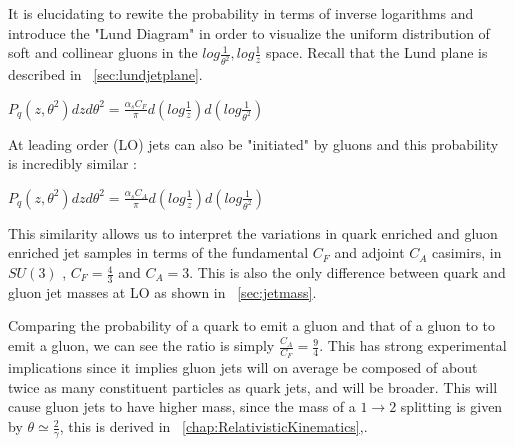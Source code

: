 It is elucidating to rewite the probability in terms of inverse logarithms and introduce the "Lund Diagram" in order to visualize the uniform distribution of soft and collinear gluons in the $log \frac{1}{ \theta^2} , log\frac{1}{z} $ space. Recall that the Lund plane is described in ~\ref{sec:lundjetplane}.




$P_q(z,\theta^2) dz d \theta^2 = \frac{\alpha_s C_F}{\pi} d( log\frac{1}{z}  ) d(log \frac{1}{ \theta^2})  $\newline

At leading order (LO) jets can also be "initiated" by gluons and this probability is incredibly similar :


$P_q(z,\theta^2) dz d \theta^2 = \frac{\alpha_s C_A}{\pi} d( log\frac{1}{z}  ) d(log \frac{1}{ \theta^2})  $\newline


This similarity allows us to interpret the variations in quark enriched and gluon enriched jet samples in terms of the fundamental $C_F$ and adjoint $C_A$ casimirs, in $SU(3)$ ,   $C_F = \frac{4}{3}$ and $C_A=3$. This is also the only difference between quark and gluon jet masses at LO as shown in ~\ref{sec:jetmass}.


Comparing the probability of a quark to emit a gluon and that of a gluon to to emit a gluon, we can see the ratio is simply $\frac{C_A}{C_F} =\frac{9}{4} $. This has strong experimental implications since it implies gluon jets will on average be composed of about twice as many constituent particles as quark jets, and will be broader. This will cause gluon jets to have higher mass, since the mass of a $1 \rightarrow 2 $ splitting is given by $\theta \simeq \frac{2}{\gamma} $, this is derived in ~\ref{chap:RelativisticKinematics},.




